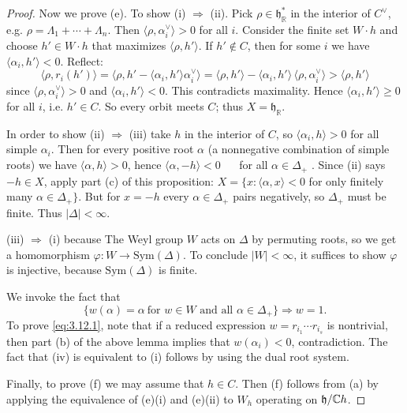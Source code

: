 \documentclass[12pt]{article}
\begin{document}
\begin{proof}
    Now we prove (e). To show (i) $\Rightarrow$ (ii). Pick $\rho\in \mathfrak{h}_{\mathbb{R}}^*$ in the interior of $C^\vee$, e.g. $\rho=\Lambda_1+\cdots+\Lambda_n$. Then
    $\langle \rho,\alpha_i^\vee\rangle>0$ for all $i$.
    Consider the finite set $W\cdot h$ and choose $h'\in W\cdot h$ that maximizes $\langle \rho, h' \rangle$.
    If $h'\notin C$, then for some $i$ we have $\langle \alpha_i,h'\rangle<0$. Reflect:
    \[
        \langle \rho, r_i(h')\rangle
        = \langle \rho, h' - \langle \alpha_i,h'\rangle \alpha_i^\vee\rangle
        = \langle \rho, h'\rangle - \langle \alpha_i,h'\rangle\,\langle \rho,\alpha_i^\vee\rangle
        > \langle \rho,h'\rangle
    \]
    since $\langle \rho,\alpha_i^\vee\rangle>0$ and $\langle \alpha_i,h'\rangle<0$. This contradicts maximality. Hence $\langle \alpha_i,h'\rangle\ge 0$ for all $i$, i.e. $h'\in C$. So every orbit meets $C$; thus $X=\mathfrak{h}_{\mathbb{R}}$.

    In order to show (ii) $\Rightarrow$ (iii) take $h$ in the interior of $C$, so $\langle \alpha_i,h\rangle>0$ for all simple $\alpha_i$. Then for every positive root $\alpha$ (a nonnegative combination of simple roots) we have $\langle \alpha, h\rangle>0$, hence
    $\langle \alpha,-h\rangle<0$ $\quad$ for all $\alpha\in\Delta_+$ .
    Since (ii) says $-h\in X$, apply part (c) of this proposition: $X=\{x : \langle \alpha,x\rangle<0$ for only finitely many $\alpha\in\Delta_+\}$. But for $x=-h$ every $\alpha\in\Delta_+$ pairs negatively, so $\Delta_+$ must be finite. Thus $|\Delta|<\infty$.

    (iii) $\Rightarrow$ (i) because The Weyl group $W$ acts on $\Delta$ by permuting roots, so we get a homomorphism $\varphi: W \longrightarrow \mathrm{Sym}(\Delta)$. To conclude $|W|<\infty$, it suffices to show $\varphi$ is injective, because $\mathrm{Sym}(\Delta)$ is finite.

    We invoke the fact that
    \begin{equation}\label{eq:3.12.1}
        \{ w(\alpha) = \alpha \ \text{for } w\in W \text{ and all } \alpha \in \Delta_+ \}
        \Rightarrow w=1.
    \end{equation}
    To prove \eqref{eq:3.12.1}, note that if a reduced expression $w=r_{i_1}\cdots r_{i_s}$
    is nontrivial, then part (b) of the above lemma implies that $w(\alpha_i)<0$, contradiction.
    The fact that (iv) is equivalent to (i) follows by using the dual root system.

    Finally, to prove (f) we may assume that $h \in C$. Then (f) follows from (a)
    by applying the equivalence of (e)(i) and (e)(ii) to $W_h$ operating on $\mathfrak{h}/\mathbb{C} h$.
\end{proof}
\end{document}
